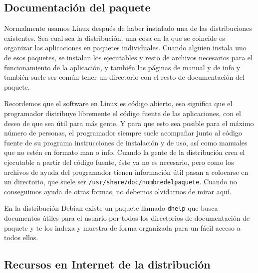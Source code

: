 \subsection{Documentación del paquete}

Normalmente  usamos  Linux  después  de haber  instalado  una  de  las
distribuciones  existentes. Sea  cual  sea la  distribución, una  cosa
en  la que  se  coincide  es organizar  las  aplicaciones en  paquetes
individuales. Cuando alguien instala uno de esos paquetes, se instalan
los ejecutables y resto de  archivos necesarios para el funcionamiento
de la aplicación, y también las páginas  de manual y de info y también
suele ser común tener un directorio  con el resto de documentación del
paquete.

Recordemos que el  software en Linux es código  abierto, eso significa
que  el programador  distribuye  libremente el  código  fuente de  las
aplicaciones, con el deseo de que sea  útil para más gente. Y para que
esto sea  posible para  el máximo número  de personas,  el programador
siempre  suele  acompañar  junto  al  código  fuente  de  su  programa
instrucciones  de instalación  y  de  uso, así  como  manuales que  no
estén  en formato  man  o info.  Cuando la  gente  de la  distribución
crea  el  ejecutable  a  partir  del código  fuente,  éste  ya  no  es
necesario,  pero como  los archivos  de ayuda  del programador  tienen
información útil  pasan a  colocarse en un  directorio, que  suele ser
{\tt /usr/share/doc/nombredelpaquete}. Cuando  no conseguimos ayuda de
otras formas, no debemos olvidarnos de mirar aquí.

En la  distribución Debian existe  un paquete llamado {\tt  dhelp} que
busca documentos útiles  para el usuario por todos  los directorios de
documentación de paquete y te los indexa y muestra de forma organizada
para un fácil acceso a todos ellos.


\subsection{Recursos en Internet de la distribución}

